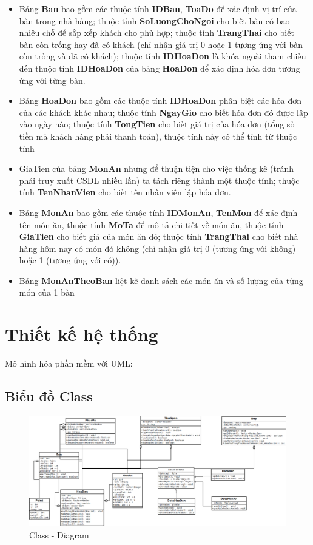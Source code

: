 \documentclass[a4paper,12pt]{report}
\begin{document}
\begin{itemize}
\item Bảng \textbf{Ban} bao gồm các thuộc tính \textbf{IDBan}, \textbf{ToaDo} để xác định vị trí của bàn trong nhà hàng; thuộc tính \textbf{SoLuongChoNgoi} cho biết bàn có bao nhiêu chỗ để sắp xếp khách cho phù hợp; thuộc tính \textbf{TrangThai} cho biết bàn còn trống hay đã có khách (chỉ nhận giá trị 0 hoặc 1 tương ứng với bàn còn trống và đã có khách); thuộc tính \textbf{IDHoaDon} là khóa ngoài tham chiếu đến thuộc tính \textbf{IDHoaDon} của bảng \textbf{HoaDon} để xác định hóa đơn tương ứng với từng bàn.
\item Bảng \textbf{HoaDon} bao gồm các thuộc tính \textbf{IDHoaDon} phân biệt các hóa đơn của các khách khác nhau; thuộc tính \textbf{NgayGio} cho biết hóa đơn đó được lập vào ngày nào; thuộc tính \textbf{TongTien} cho biết giá trị của hóa đơn (tổng số tiền mà khách hàng phải thanh toán), thuộc tính này có thể tính từ thuộc tính \item{GiaTien} của bảng \textbf{MonAn} nhưng để thuận tiện cho việc thống kê (tránh phải truy xuất CSDL nhiều lần) ta tách riêng thành một thuộc tính; thuộc tính \textbf{TenNhanVien} cho biết tên nhân viên lập hóa đơn.
\item Bảng \textbf{MonAn} bao gồm các thuộc tính \textbf{IDMonAn}, \textbf{TenMon} để xác định tên món ăn, thuộc tính \textbf{MoTa} để mô tả chi tiết về món ăn, thuộc tính \textbf{GiaTien} cho biết giá của món ăn đó; thuộc tính \textbf{TrangThai} cho biết nhà hàng hôm nay có món đó không (chỉ nhận giá trị 0 (tương ứng với không) hoặc 1 (tương ứng với có)).
\item Bảng \textbf{MonAnTheoBan} liệt kê danh sách các món ăn và số lượng của từng món của 1 bàn   
\end{itemize}

\chapter{Thiết kế hệ thống}
Mô hình hóa phần mềm với UML:

\begin{landscape}
	\section{Biểu đồ Class}
	\begin{figure}[h]
		\centering
		\includegraphics[scale=0.50]{UML-Final.png}
		\caption{Class - Diagram}
	\end{figure}
\end{landscape}
\restoregeometry
\end{document}
